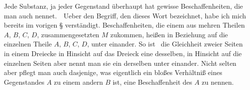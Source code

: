 \begin{aufza} 
\item Jede Substanz, ja jeder Gegenstand überhaupt hat gewisse Beschaffenheiten, die man auch  nennet.~\ Ueber den Begriff, den dieses Wort bezeichnet, habe ich mich bereits im vorigen § verständigt. Beschaffenheiten, die einem aus mehren Theilen $A$, $B$, $C$, $D$, zusammengesetzten  $M$ zukommen, heißen in Beziehung auf die einzelnen Theile $A$, $B$, $C$, $D$,  unter einander. So ist \zB\ die Gleichheit zweier Seiten in einem Dreiecke in Hinsicht auf das Dreieck eine  desselben, in Hinsicht auf die einzelnen Seiten aber nennt man sie ein  derselben unter einander. Nicht selten aber pflegt man auch dasjenige, was eigentlich ein bloßes Verhältniß eines Gegenstandes $A$ zu einem andern $B$ ist, eine Beschaffenheit des $A$ zu nennen.\par

\end{aufza}
